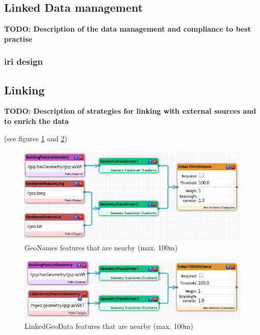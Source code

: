\documentclass[draft,final]{vutinfth} %
\newcommand{\todo}[1]{{\color{red}\textbf{TODO: {#1}}}} %
\begin{document}
\subsection{Linked Data management}
\label{solution-architectural-prototype:ld-management}
\todo{Description of the data management and compliance to best practise}

\subsubsection{\gls{iri} design}
\label{solution-architectural-prototype:ld-management:iri-design}


\subsection{Linking}
\label{solution-architectural-prototype:linking}
\todo{Description of strategies for linking with external sources and to enrich the data}

(see figures \ref{fig:solution-architectural-prototype:ld-management:linking:gnNearBy} and \ref{fig:solution-architectural-prototype:ld-management:linking:lgdNearBy})

\begin{figure}[h]
    \centering
    \includegraphics[width=1.0\textwidth]{graphics/linking/geonamesFeatureNearByLinking.png}
    \caption{GeoNames features that are nearby (max. 100m)}
    \label{fig:solution-architectural-prototype:ld-management:linking:gnNearBy}
\end{figure}

\begin{figure}[h]
    \centering
    \includegraphics[width=1.0\textwidth]{graphics/linking/linkedgeodataAmenityNearBy.png}
    \caption{LinkedGeoData features that are nearby (max. 100m)}
    \label{fig:solution-architectural-prototype:ld-management:linking:lgdNearBy}
\end{figure}
\end{document}
